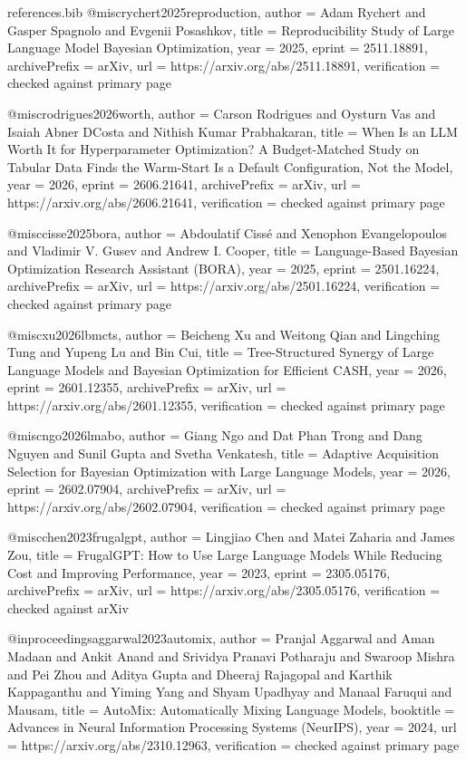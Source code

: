 \begin{filecontents*}[overwrite]{references.bib}
@misc{rychert2025reproduction,
  author = {Adam Rychert and Gasper Spagnolo and Evgenii Posashkov},
  title = {Reproducibility Study of Large Language Model {B}ayesian Optimization},
  year = {2025},
  eprint = {2511.18891},
  archivePrefix = {arXiv},
  url = {https://arxiv.org/abs/2511.18891},
  verification = {checked against primary page}
}

@misc{rodrigues2026worth,
  author = {Carson Rodrigues and Oysturn Vas and Isaiah Abner DCosta and Nithish Kumar Prabhakaran},
  title = {When Is an {LLM} Worth It for Hyperparameter Optimization? {A} Budget-Matched Study on Tabular Data Finds the Warm-Start Is a Default Configuration, Not the Model},
  year = {2026},
  eprint = {2606.21641},
  archivePrefix = {arXiv},
  url = {https://arxiv.org/abs/2606.21641},
  verification = {checked against primary page}
}

@misc{cisse2025bora,
  author = {Abdoulatif Ciss{\'e} and Xenophon Evangelopoulos and Vladimir V. Gusev and Andrew I. Cooper},
  title = {Language-Based {B}ayesian Optimization Research Assistant ({BORA})},
  year = {2025},
  eprint = {2501.16224},
  archivePrefix = {arXiv},
  url = {https://arxiv.org/abs/2501.16224},
  verification = {checked against primary page}
}

@misc{xu2026lbmcts,
  author = {Beicheng Xu and Weitong Qian and Lingching Tung and Yupeng Lu and Bin Cui},
  title = {Tree-Structured Synergy of Large Language Models and {B}ayesian Optimization for Efficient {CASH}},
  year = {2026},
  eprint = {2601.12355},
  archivePrefix = {arXiv},
  url = {https://arxiv.org/abs/2601.12355},
  verification = {checked against primary page}
}

@misc{ngo2026lmabo,
  author = {Giang Ngo and Dat Phan Trong and Dang Nguyen and Sunil Gupta and Svetha Venkatesh},
  title = {Adaptive Acquisition Selection for {B}ayesian Optimization with Large Language Models},
  year = {2026},
  eprint = {2602.07904},
  archivePrefix = {arXiv},
  url = {https://arxiv.org/abs/2602.07904},
  verification = {checked against primary page}
}

@misc{chen2023frugalgpt,
  author = {Lingjiao Chen and Matei Zaharia and James Zou},
  title = {{FrugalGPT}: How to Use Large Language Models While Reducing Cost and Improving Performance},
  year = {2023},
  eprint = {2305.05176},
  archivePrefix = {arXiv},
  url = {https://arxiv.org/abs/2305.05176},
  verification = {checked against arXiv}
}

@inproceedings{aggarwal2023automix,
  author = {Pranjal Aggarwal and Aman Madaan and Ankit Anand and Srividya Pranavi Potharaju and Swaroop Mishra and Pei Zhou and Aditya Gupta and Dheeraj Rajagopal and Karthik Kappaganthu and Yiming Yang and Shyam Upadhyay and Manaal Faruqui and Mausam},
  title = {{AutoMix}: Automatically Mixing Language Models},
  booktitle = {Advances in Neural Information Processing Systems (NeurIPS)},
  year = {2024},
  url = {https://arxiv.org/abs/2310.12963},
  verification = {checked against primary page}
}


\end{filecontents*}
